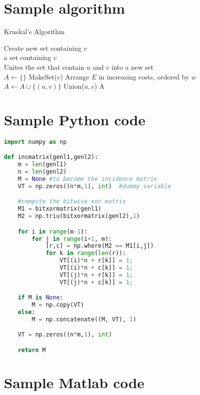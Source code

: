 \section{Sample algorithm}
\begin{algorithm}
	\caption{Kruskal's Algorithm}\label{alg:kruskal}
	\begin{algorithmic}[1]
			\State Create new set containing $v$
		\EndProcedure \\
		
			\State\Return a set containing $v$
		\EndFunction \\
		
			\State Unites the set that contain $u$ and $v$ into a new set
		\EndProcedure \\
		
			\State $A \gets \{\}$
				\State MakeSet($v$)
			\EndFor
			\State Arrange $E$ in increasing costs, ordered by $w$
					\State $A \gets A \cup \{(u,v)\}$
					\State Union($u,v$)
				\EndIf
			\EndFor
			\State \Return A
		\EndFunction
	\end{algorithmic}
\end{algorithm}

\newpage
\section{Sample Python code}
\begin{lstlisting}[language=Python]
import numpy as np

def incmatrix(genl1,genl2):
	m = len(genl1)
	n = len(genl2)
	M = None #to become the incidence matrix
	VT = np.zeros((n*m,1), int)  #dummy variable

	#compute the bitwise xor matrix
	M1 = bitxormatrix(genl1)
	M2 = np.triu(bitxormatrix(genl2),1) 

	for i in range(m-1):
		for j in range(i+1, m):
			[r,c] = np.where(M2 == M1[i,j])
			for k in range(len(r)):
				VT[(i)*n + r[k]] = 1;
				VT[(i)*n + c[k]] = 1;
				VT[(j)*n + r[k]] = 1;
				VT[(j)*n + c[k]] = 1;

	if M is None:
		M = np.copy(VT)
	else:
		M = np.concatenate((M, VT), 1)

	VT = np.zeros((n*m,1), int)

	return M
\end{lstlisting}

\newpage
\section{Sample Matlab code}
